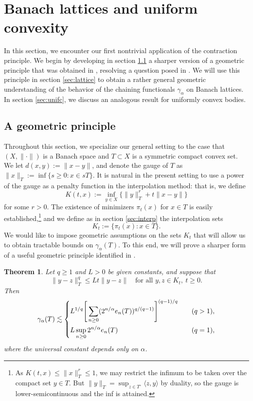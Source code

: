 \documentclass[10pt,reqno]{amsart}
\newtheorem{thm}{Theorem}[section]
\theoremstyle{definition}
\numberwithin{equation}{section}
\numberwithin{figure}{section}
\numberwithin{table}{section}
\begin{document}
\section{Banach lattices and uniform convexity}
\label{sec:geom}

In this section, we encounter our first nontrivial application of the 
contraction principle. We begin by developing in section \ref{sec:geomp} a 
sharper version of a geometric principle that was obtained in 
\cite{vH16a}, resolving a question posed in \cite[Remark 4.4]{vH16a}. We 
will use this principle in section \ref{sec:lattice} to obtain a rather 
general geometric understanding of the behavior of the chaining 
functionals $\gamma_\alpha$ on Banach lattices. In section 
\ref{sec:unifc}, we discuss an analogous result for uniformly convex 
bodies.

\subsection{A geometric principle}
\label{sec:geomp}

Throughout this section, we specialize our general setting to the case 
that $(X,\|\cdot\|)$ is a Banach space and $T\subset X$ is a symmetric 
compact convex set. We let $d(x,y):=\|x-y\|$, and denote the gauge of $T$ 
as $\|x\|_T :=\inf\{s\ge 0:x\in sT\}$. It is natural in the present 
setting to use a power of the gauge as a penalty function in the 
interpolation method: that is, we define
$$
	K(t,x) := \inf_{y\in X}\{\|y\|_T^r+t\|x-y\|\}
$$
for some $r>0$. The existence of minimizers $\pi_t(x)$ for $x\in T$ is 
easily established,\footnote{
	As $K(t,x)\le \|x\|_T^r\le 1$, we may restrict the
	infimum to be taken over the compact set $y\in T$. But
	$\|y\|_T=\sup_{z\in T^\circ}\langle z,y\rangle$ by duality,
	so the gauge is lower-semicontinuous and the inf is attained.
}
and we define as in section \ref{sec:interp} the interpolation sets
$$
	K_t := \{\pi_t(x):x\in T\}.
$$
We would like to impose geometric assumptions on the sets $K_t$ 
that will allow us to obtain tractable bounds on $\gamma_\alpha(T)$. To 
this end, we will prove a sharper form of a useful geometric principle
identified in \cite[Theorem 4.1]{vH16a}.

\begin{thm}
\label{thm:geom}
Let $q\ge 1$ and $L>0$ be given constants, and suppose that
$$
	\|y-z\|_T^q \le Lt\|y-z\|\quad\mbox{for all }y,z\in K_t,~t\ge 0.
$$
Then
$$
	\gamma_\alpha(T)\lesssim
	\begin{dcases}
	L^{1/q}\Bigg[\sum_{n\ge 0}(2^{n/\alpha}e_n(T))^{q/(q-1)}\Bigg]^{(q-1)/q}
	&\quad (q>1),\\
	L\sup_{n\ge 0}2^{n/\alpha}e_n(T)&\quad(q=1),
	\end{dcases}
$$
where the universal constant depends only on $\alpha$.
\end{thm}
\end{document}
